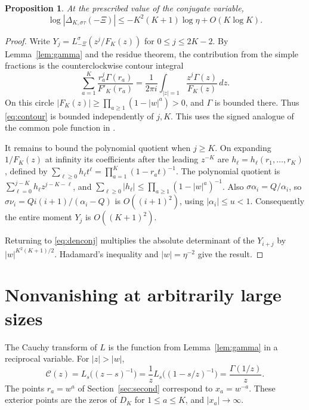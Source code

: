 \documentclass[11pt,letterpaper]{article}
\newtheorem{proposition}[theorem]{Proposition}
\numberwithin{equation}{section}
\begin{document}
\begin{proposition}\label{prop:second}
At the prescribed value of the conjugate variable,
\[
          \log|\Delta_{K,\sigma\tau}(-\Xi)|
             \le -K^2(K+1)\log\eta+O(K\log K).
\]
\end{proposition}
\begin{proof}
Write \(Y_j=L^\sigma_{-\Xi}(z^j/F_K(z))\) for \(0\le j\le 2K-2\).
By Lemma~\ref{lem:gamma} and the residue theorem, the contribution
from the simple fractions is the counterclockwise contour integral
\begin{equation}\label{eq:contour}
 \sum_{a=1}^K\frac{r_a^j\Gamma(r_a)}{F'_K(r_a)}
       =\frac{1}{2\pi i}\int_{|z|=1}\frac{z^j\Gamma(z)}{F_K(z)}\,dz .
\end{equation}
On this circle \(|F_K(z)|\ge\prod_{a\ge1}(1-|w|^a)>0\), and
\(\Gamma\) is bounded there. Thus \eqref{eq:contour} is bounded
independently of \(j,K\). This uses the signed analogue of the
common pole function in \cite[Proposition~5.1]{KLucas}.

It remains to bound the polynomial quotient when \(j\ge K\).
On expanding \(1/F_K(z)\) at infinity its coefficients after the
leading \(z^{-K}\) are \(h_\ell=h_\ell(r_1,\ldots,r_K)\), defined by
\(\sum_{\ell\ge0}h_\ell t^\ell=\prod_{a=1}^K(1-r_a t)^{-1}\).
The polynomial quotient is
\(\sum_{\ell=0}^{j-K}h_\ell z^{j-K-\ell}\), and
\(\sum_{\ell\ge0}|h_\ell|\le\prod_{a\ge1}(1-|w|^a)^{-1}\).
Also \(\sigma\alpha_i=Q/\alpha_i\), so
\(\sigma\nu_i=Q i(i+1)/(\alpha_i-Q)\) is \(O((i+1)^2)\),
using \(|\alpha_i|\le u<1\). Consequently the entire moment
\(Y_j\) is \(O((K+1)^2)\).

Returning to \eqref{eq:denconj} multiplies the absolute determinant
of the \(Y_{i+j}\) by \(|w|^{K^2(K+1)/2}\). Hadamard's inequality
and \(|w|=\eta^{-2}\) give the result.
\end{proof}

\section{Nonvanishing at arbitrarily large sizes}\label{sec:nonzero}

The Cauchy transform of \(L\) is the function from
Lemma~\ref{lem:gamma} in a reciprocal variable. For \(|z|>|w|\),
\[
  \mathcal C(z)=L_s\big((z-s)^{-1}\big)
       =\frac{1}{z}L_s\big((1-s/z)^{-1}\big)
       =\frac{\Gamma(1/z)}{z}.
\]
The points \(r_a=w^a\) of Section~\ref{sec:second} correspond to
\(x_a=w^{-a}\). These exterior points are the zeros of \(D_K\)
for \(1\le a\le K\), and \(|x_a|\to\infty\).
\end{document}

